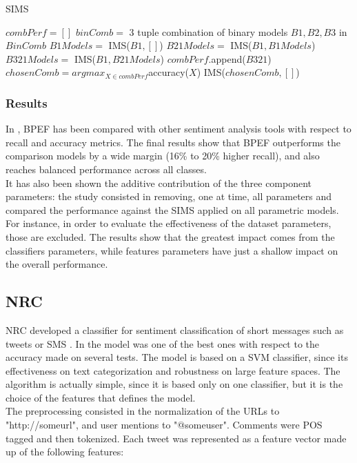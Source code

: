 \begin{algorithm}
	\caption{SIMS}
	\label{alg:SIMS}
	\begin{algorithmic}[1]
		
		\State $combPerf = []$
		\State $binComb = $ 3 tuple combination of binary models
		\State  
		\For $B1, B2, B3$ in $BinComb$
		\State $B1Models = $ IMS($B1, []$)
		\State $B21Models = $ IMS($B1, B1Models$)
		\State $B321Models = $ IMS($B1, B21Models$)
		\State $combPerf$.append($B321$)
		\EndFor
		\State $chosenComb = argmax_{X \in combPerf}$accuracy($X$)
		\State IMS($chosenComb, []$)
		
	\end{algorithmic}
\end{algorithm}

\subsubsection{Results}

In \cite{Hassan2013TwitterSA}, \ac{BPEF} has been compared with other sentiment analysis tools with respect to recall and accuracy metrics. The final results show that \ac{BPEF} outperforms the comparison models by a wide margin (16\% to 20\% higher recall), and also reaches balanced performance across all classes.\\
It has also been shown the additive contribution of the three component parameters: the study consisted in removing, one at time, all parameters and compared the performance against the SIMS applied on all parametric models. For instance, in order to evaluate the effectiveness of the dataset parameters, those are excluded. The results show that the greatest impact comes from the classifiers parameters, while features parameters have just a shallow impact on the overall performance.

\subsection{NRC}

\ac{NRC} developed a classifier for sentiment classification of short messages such as tweets or SMS \cite{DBLP:journals/corr/MohammadKZ13}. In \cite{Zimbra:2018:STS:3210372.3185045} the model was one of the best ones with respect to the accuracy made on several tests. The model is based on a \ac{SVM} classifier, since its effectiveness on text categorization and robustness on large feature spaces. The algorithm is actually simple, since it is based only on one classifier, but it is the choice of the features that defines the model.\\
The preprocessing consisted in the normalization of the URLs to "http://someurl", and user mentions to "@someuser". Comments were \ac{POS} tagged and then tokenized. Each tweet was represented as a feature vector made up of the following features:

